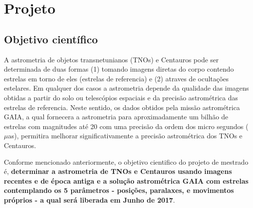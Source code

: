 \documentclass[a4paper, 11pt]{article}
\begin{document}
\renewcommand{\figurename}{\textsc{Figura}}
\renewcommand{\tablename}{\textsc{Tabela}}
\renewcommand{\refname}{Refer\^encias}




\section{Projeto}

\subsection{Objetivo científico}

A astrometria de objetos transnetunianos (TNOs) e Centauros pode ser determinada de duas formas (1) tomando imagens diretas do corpo contendo estrelas em torno de eles (estrelas de referencia) e (2) atraves de ocultações estelares. Em qualquer dos casos a astrometria depende da qualidade das imagens obtidas a partir do solo ou telescópios espaciais e da precisão astrométrica das estrelas de referencia. Neste sentido, os dados obtidos pela missão astrométrica GAIA, a qual fornecera a astrometria para aproximadamente um bilhão de estrelas com magnitudes até 20 com uma precisão da ordem dos micro segundos ($\mu$as), permitira melhorar significativamente a precisão astrométrica dos TNOs e Centauros.

Conforme mencionado anteriormente, o objetivo cientifico do projeto de mestrado é, \textbf{determinar a astrometria de TNOs e Centauros usando imagens recentes e de época antiga e a solução astrométrica GAIA com estrelas contemplando os 5 parâmetros - posições, paralaxes, e movimentos próprios - a qual será liberada em Junho de 2017}.
\end{document}
